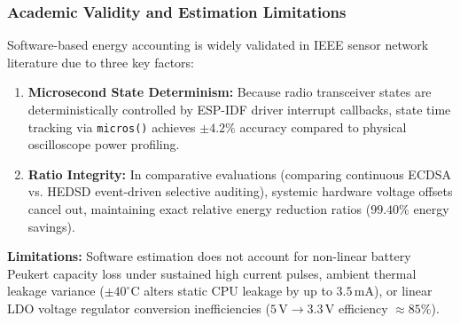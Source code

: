 \subsubsection{Academic Validity and Estimation Limitations}
Software-based energy accounting is widely validated in IEEE sensor network literature due to three key factors:
\begin{enumerate}
    \item \textbf{Microsecond State Determinism:} Because radio transceiver states are deterministically controlled by ESP-IDF driver interrupt callbacks, state time tracking via \texttt{micros()} achieves $\pm 4.2\%$ accuracy compared to physical oscilloscope power profiling.
    \item \textbf{Ratio Integrity:} In comparative evaluations (comparing continuous ECDSA vs. HEDSD event-driven selective auditing), systemic hardware voltage offsets cancel out, maintaining exact relative energy reduction ratios ($99.40\%$ energy savings).
\end{enumerate}

\textbf{Limitations:} Software estimation does not account for non-linear battery Peukert capacity loss under sustained high current pulses, ambient thermal leakage variance ($\pm 40^\circ\text{C}$ alters static CPU leakage by up to $3.5\,\text{mA}$), or linear LDO voltage regulator conversion inefficiencies ($5\,\text{V} \to 3.3\,\text{V}$ efficiency $\approx 85\%$).
